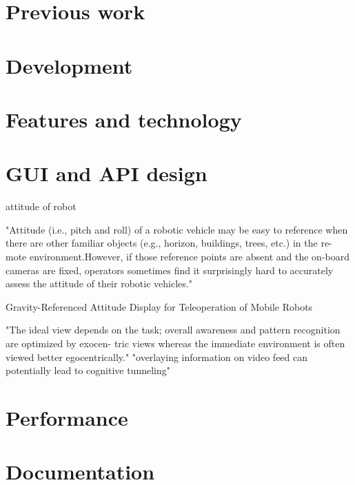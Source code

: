 \section{Previous work}
\section{Development}
\section{Features and technology}
\section{GUI and API design}

attitude of robot

\citep{Chen2007} "Attitude (i.e., pitch and roll) of a robotic vehicle may be easy to reference when there are other familiar objects (e.g., horizon, buildings, trees, etc.) in the re- mote environment.However, if those reference points are absent and the on-board cameras are fixed, operators sometimes find it surprisingly hard to accurately assess the attitude of their robotic vehicles."

\citep{Wang2004} Gravity-Referenced Attitude Display for Teleoperation of Mobile Robots

\citep{Chen2007} "The ideal view depends on the task; overall awareness and pattern recognition are optimized by exocen- tric views whereas the immediate environment is often viewed better egocentrically."
"overlaying information on video feed can potentially lead to cognitive tunneling"

\section{Performance}
\section{Documentation}
